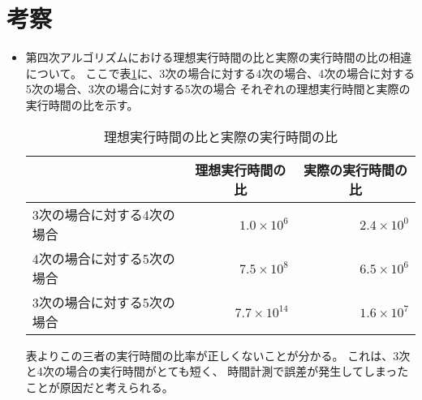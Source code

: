 \section{考察}
\begin{itemize}
\item 第四次アルゴリズムにおける理想実行時間の比と実際の実行時間の比の相違について。
	ここで表\ref{tab:bohemian-rhapsody}に、3次の場合に対する4次の場合、4次の場合に対する5次の場合、3次の場合に対する5次の場合
	それぞれの理想実行時間と実際の実行時間の比を示す。

\begin{table}[htb]
	\begin{center}
	\begin{tabular}{|l||r|r|}
\hline
& \multicolumn{1}{|c|}{理想実行時間の比} & \multicolumn{1}{|c|}{実際の実行時間の比} \\
\hline\hline
3次の場合に対する4次の場合 & $1.0 \times 10^6$  & $2.4 \times 10^0$ \\\hline
4次の場合に対する5次の場合 & $7.5 \times 10^8$  & $6.5 \times 10^6$ \\\hline
3次の場合に対する5次の場合 & $7.7 \times 10^{14}$  & $1.6 \times 10^7$ \\\hline
	\end{tabular}
	\end{center}
	\caption{理想実行時間の比と実際の実行時間の比}
	\label{tab:bohemian-rhapsody}
\end{table}

表よりこの三者の実行時間の比率が正しくないことが分かる。
これは、3次と4次の場合の実行時間がとても短く、
時間計測で誤差が発生してしまったことが原因だと考えられる。


\end{itemize}
